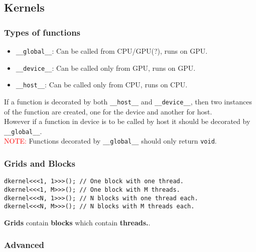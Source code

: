 \begin{multicols*}{3}
\section*{Kernels}

\subsubsection*{Types of functions}

\begin{itemize}
	\item \texttt{\_\_global\_\_}: Can be called from CPU/GPU(?), runs on GPU.
	\item \texttt{\_\_device\_\_}: Can be called only from GPU, runs on GPU. 
	\item \texttt{\_\_host\_\_}: Can be called only from CPU, runs on CPU.
\end{itemize}

If a function is decorated by both \texttt{\_\_host\_\_} and \texttt{\_\_device\_\_}, then two instances of the function are created, one for the device and another for host.\\
However if a function in device is to be called by host it should be decorated by \texttt{\_\_global\_\_}.\\
\textcolor{red}{NOTE:} Functions decorated by \texttt{\_\_global\_\_} should only return \texttt{void}.

\subsubsection*{Grids and Blocks}

\begin{mdframed}[backgroundcolor=gray!10,linecolor=Firebrick4]
\begin{verbatim}
dkernel<<<1, 1>>>(); // One block with one thread. 
dkernel<<<1, M>>>(); // One block with M threads. 
dkernel<<<N, 1>>>(); // N blocks with one thread each.
dkernel<<<N, M>>>(); // N blocks with M threads each.
\end{verbatim}
\end{mdframed}

\textbf{Grids} contain \textbf{blocks} which contain \textbf{threads.}.\\
\textbf{}

\subsubsection*{Advanced}


\end{multicols*}
